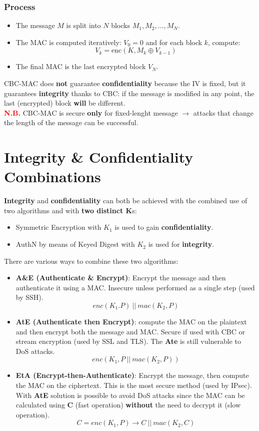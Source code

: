 \begin{itemize}
\begin{customquote}
    \subsubsection{Process}
    \begin{itemize}
        \item The message \(M\) is split into \(N\) blocks \(M_1, M_2, \dots, M_N\).
        \item The MAC is computed iteratively: \(V_0 = 0\) and for each block \(k\), compute:
        \[
        V_k = \text{enc}(K, M_k \oplus V_{k-1})
        \]
        \item The final MAC is the last encrypted block \(V_N\).
    \end{itemize}
    \end{customquote}
    CBC-MAC does \textbf{not} guarantee \textbf{confidentiality} because the IV is fixed, but it guarantees \textbf{integrity} thanks to CBC: if the message is modified in any point, the last (encrypted) block \textbf{will} be different.\\
    \textcolor{red}{\textbf{N.B.}} CBC-MAC is secure \textbf{only} for fixed-lenght message \(\rightarrow \) attacks that change the length of the message can be successful.
\end{itemize}

\section{Integrity \& Confidentiality Combinations}
\textbf{Integrity} and \textbf{confidentiality} can both be achieved with the combined use of two algorithms
and with \textbf{two distinct K}s:
\begin{itemize}
    \item Symmetric Encryption with \(K_1\) is used to gain \textbf{confidentiality}.
    \item AuthN by means of Keyed Digest with \(K_2\) is used for \textbf{integrity}.
\end{itemize}
There are various ways to combine these two algorithms:
\begin{itemize}
    \item \textbf{A\&E (Authenticate \& Encrypt)}: Encrypt the message and then authenticate it using a MAC. Insecure unless performed as a single step (used by SSH).
    \[enc(K_1.P)\ ||\ mac(K_2,P)\]
    \item \textbf{AtE (Authenticate then Encrypt)}: compute the MAC on the plaintext and then encrypt both the message and MAC. Secure if used with CBC or stream encryption (used by SSL and TLS). The \textbf{Ate} is still vulnerable to DoS attacks.
    \[enc(K_1,P\ ||\ mac(K_2,P))\]
    \vspace{-0.6cm}
    \item \textbf{EtA (Encrypt-then-Authenticate)}: Encrypt the message, then compute the MAC on the ciphertext. This is the most secure method (used by IPsec). With \textbf{AtE} solution is possible to avoid DoS attacks since the MAC can be calculated using \textbf{C} (fast operation) \textbf{without} the need to decrypt it (slow operation).
    \[C=enc(K_1,P)\rightarrow C\ ||\ mac(K_2,C)\]
\end{itemize}

